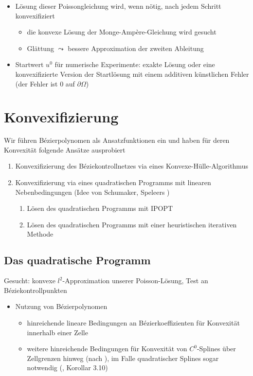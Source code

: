\documentclass[a4paper,11pt]{article}
\begin{document}
\begin{itemize}
	\item Lösung dieser Poissongleichung wird, wenn nötig, nach jedem Schritt konvexifiziert
	\begin{itemize}
		\item die konvexe Lösung der Monge-Amp\`ere-Gleichung wird gesucht
		\item Glättung $\leadsto$ bessere Approximation der zweiten Ableitung
	\end{itemize}
	\item Startwert $u^0$ für numerische Experimente: exakte Lösung oder eine konvexifizierte Version der Startlösung mit einem additiven künstlichen Fehler (der Fehler ist 0 auf $\partial \Omega$)
\end{itemize}

\section*{Konvexifizierung}

Wir führen B\'ezierpolynomen als Ansatzfunktionen ein und haben für deren Konvexität folgende Ansätze ausprobiert
\begin{enumerate}
	\item Konvexifizierung des B\'eziekontrollnetzes via eines Konvexe-Hülle-Algorithmus
	\item Konvexifizierung via eines quadratischen Programms mit linearen Nebenbedingungen (Idee von Schumaker, Speleers \cite{SS2014})
	        \begin{enumerate}
	        	\item Lösen des quadratischen Programms mit IPOPT
	        	\item Lösen des quadratischen Programms mit einer heuristischen iterativen Methode
	        \end{enumerate}
\end{enumerate}

\subsection*{Das quadratische Programm}

	Gesucht: konvexe $l^2$-Approximation unserer Poisson-Lösung, Test an B\'eziekontrollpunkten
	
	\begin{itemize}
		\item Nutzung von B\'ezierpolynomen
		\begin{itemize}
			\item hinreichende lineare Bedingungen an B\'ezierkoeffizienten für Konvexität innerhalb einer Zelle
			\item weitere hinreichende Bedingungen für Konvexität von $C^0$-Splines über Zellgrenzen hinweg (nach \cite{SS2014}), im Falle quadratischer Splines sogar notwendig (\cite{SS2014},  Korollar 3.10)
		\end{itemize}
	\end{itemize}
	
\end{document}
